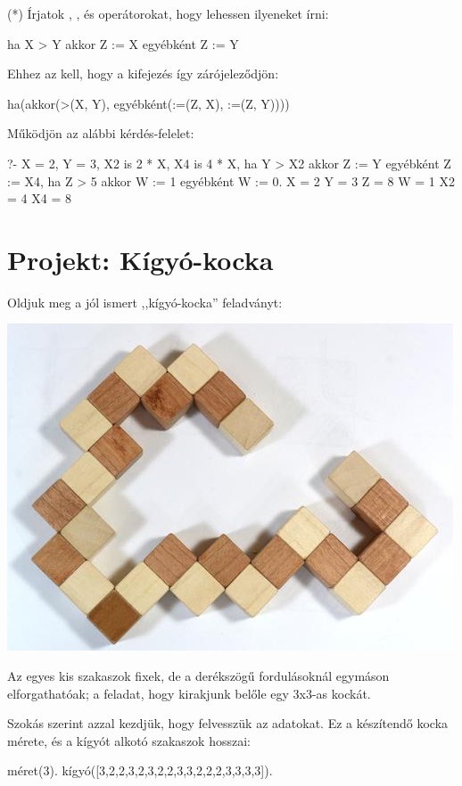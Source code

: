 \begin{problem}
\item (*) Írjatok , ,
 és \pr{:=} operátorokat, hogy
lehessen ilyeneket írni:
\begin{query}
ha X > Y akkor Z := X egyébként Z := Y
\end{query}
Ehhez az kell, hogy a kifejezés így zárójeleződjön:
\begin{query}
ha(akkor(>(X, Y), egyébként(:=(Z, X), :=(Z, Y))))
\end{query}
Működjön az alábbi kérdés-felelet:
\begin{query}
?- X = 2, Y = 3,
   X2 is 2 * X, X4 is 4 * X,
   ha Y > X2 akkor Z := Y egyébként Z := X4,
   ha Z > 5 akkor W := 1 egyébként W := 0.
X = 2
Y = 3
Z = 8
W = 1
X2 = 4
X4 = 8
\end{query}
\end{problem}

\section{Projekt: Kígyó-kocka}
Oldjuk meg a jól ismert ,,kígyó-kocka'' feladványt:

\begin{center}
\includegraphics[width=.8\textwidth]{images/snake-cube.jpg}
\end{center}

Az egyes kis szakaszok fixek, de a derékszögű
fordulásoknál egymáson elforgathatóak; a feladat,
hogy kirakjunk belőle egy 3x3-as kockát.

Szokás szerint azzal kezdjük, hogy felvesszük az
adatokat. Ez a készítendő kocka mérete, és a kígyót
alkotó szakaszok hosszai:
\begin{program}
méret(3).
kígyó([3,2,2,3,2,3,2,2,3,3,2,2,2,3,3,3,3]).
\end{program}

